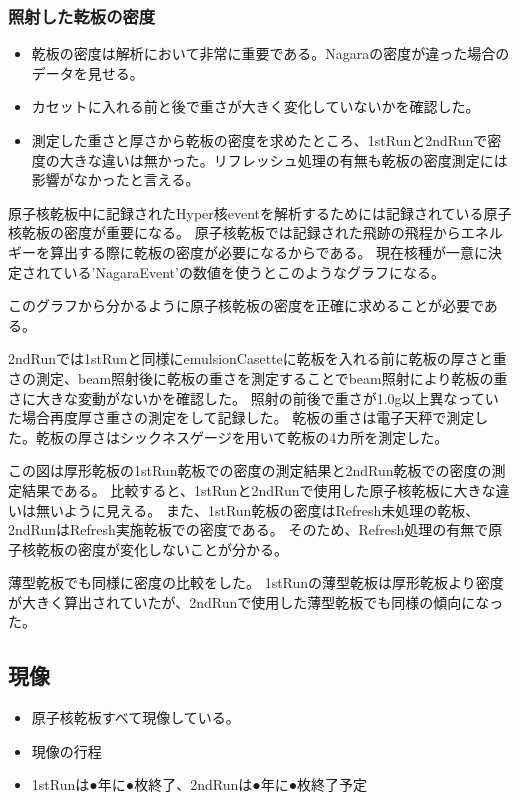 \documentclass[12pt,a4paper]{jarticle}
\begin{document}
\subsubsection{照射した乾板の密度}
\begin{itemize}
 \item 乾板の密度は解析において非常に重要である。Nagaraの密度が違った場合のデータを見せる。
 \item カセットに入れる前と後で重さが大きく変化していないかを確認した。
 \item 測定した重さと厚さから乾板の密度を求めたところ、1stRunと2ndRunで密度の大きな違いは無かった。リフレッシュ処理の有無も乾板の密度測定には影響がなかったと言える。
\end{itemize}
原子核乾板中に記録されたHyper核eventを解析するためには記録されている原子核乾板の密度が重要になる。
原子核乾板では記録された飛跡の飛程からエネルギーを算出する際に乾板の密度が必要になるからである。
現在核種が一意に決定されている'NagaraEvent'の数値を使うとこのようなグラフになる。
\par
このグラフから分かるように原子核乾板の密度を正確に求めることが必要である。
\par
2ndRunでは1stRunと同様にemulsionCasetteに乾板を入れる前に乾板の厚さと重さの測定、beam照射後に乾板の重さを測定することでbeam照射により乾板の重さに大きな変動がないかを確認した。
照射の前後で重さが1.0g以上異なっていた場合再度厚さ重さの測定をして記録した。
乾板の重さは電子天秤で測定した。乾板の厚さはシックネスゲージを用いて乾板の4カ所を測定した。
\par
この図は厚形乾板の1stRun乾板での密度の測定結果と2ndRun乾板での密度の測定結果である。
比較すると、1stRunと2ndRunで使用した原子核乾板に大きな違いは無いように見える。
また、1stRun乾板の密度はRefresh未処理の乾板、2ndRunはRefresh実施乾板での密度である。
そのため、Refresh処理の有無で原子核乾板の密度が変化しないことが分かる。
\par
薄型乾板でも同様に密度の比較をした。
1stRunの薄型乾板は厚形乾板より密度が大きく算出されていたが、2ndRunで使用した薄型乾板でも同様の傾向になった。
\subsection{現像}
\begin{itemize}
 \item 原子核乾板すべて現像している。
 \item 現像の行程
 \item 1stRunは●年に●枚終了、2ndRunは●年に●枚終了予定
\end{itemize}
\end{document}
